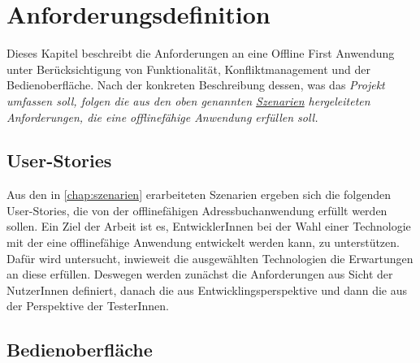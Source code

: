 \chapter{\label{chap:anforderungen}Anforderungsdefinition}
Dieses Kapitel beschreibt die Anforderungen an eine Offline First Anwendung unter Berücksichtigung von Funktionalität, Konfliktmanagement und der Bedienoberfläche.
Nach der konkreten Beschreibung dessen, was das \it{Projekt} umfassen soll, folgen die aus den oben genannten \hyperref[chap:szenarien]{Szenarien} hergeleiteten Anforderungen, die eine offlinefähige Anwendung erfüllen soll.
%
%

%
%

%
%
\section{User-Stories}
Aus den in \autoref{chap:szenarien} erarbeiteten Szenarien ergeben sich die folgenden User-Stories, die von der offlinefähigen Adressbuchanwendung erfüllt werden sollen.
Ein Ziel der Arbeit ist es, EntwicklerInnen bei der Wahl einer Technologie mit der eine offlinefähige Anwendung entwickelt werden kann, zu unterstützen. Dafür wird untersucht, inwieweit die ausgewählten Technologien die Erwartungen an diese erfüllen.
Deswegen werden zunächst die Anforderungen aus Sicht der NutzerInnen definiert, danach die aus Entwicklingsperspektive und dann die aus der Perspektive der TesterInnen.



%
%
\section{Bedienoberfläche}
